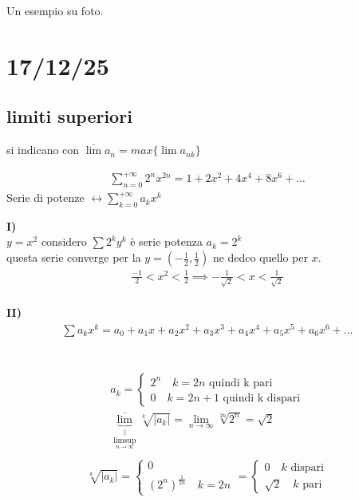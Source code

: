 \documentclass[a4paper, oneside]{article}
\begin{document}
Un esempio su foto.


\section{17/12/25}
\subsection{limiti superiori}
si indicano con $\overline{\lim} a_n = max\{ \lim a_{nk} \}$
\begin{example}
  \begin{gather*}
    \sum_{n=0}^{+\infty} 2^n x^{2n} = 1 +2x^2 + 4x^4 + 8x^6 + \dots
  \end{gather*}
  Serie di potenze $\leftrightarrow \sum_{k=0}^{+\infty} a_k x^k$
\end{example}

\textbf{I)} \\
$y = x^2$ considero $\sum 2^k y^k$ è serie potenza $a_k = 2^k$\\
 questa serie converge per la $y = (-\frac{1}{2}, \frac{1}{2})$ ne dedco quello per $x$.
 \begin{gather*}
    \frac{-1}{2} < x^2 < \frac{1}{2} \implies -\frac{1}{\sqrt{2}} < x < \frac{1}{\sqrt{2}}
 \end{gather*} 
\hfill\\
\textbf{II)}
\begin{gather*}
  \sum a_k x^k = a_0 + a_1 x + a_2 x^2 + a_3 x^3 + a_4 x^4 + a_5 x^5 + a_6 x^6 + \dots \\
\end{gather*}

\hfill\\
\begin{gather*}
  a_k = \begin{cases}
    2^{n} \quad k = 2n \text{ quindi k pari}\\
    0 \quad k = 2n + 1 \text{ quindi k dispari}
  \end{cases} \\
  \underbrace{\overline{\lim}}_{\overset{||}{\limsup_{n \to \infty}}} \sqrt[k]{|a_k|} = \lim_{n\to \infty} \sqrt[2n]{2^n} = \sqrt{2} \\
\end{gather*}
\begin{gather*}
  \sqrt[k]{|a_k|} = \begin{cases}
    0\\
    (2^n)^{\frac{1}{2n}} \quad k = 2n
  \end{cases} = \begin{cases}
    0 \quad k \text{ dispari}\\
    \sqrt{2} \quad k \text{ pari}
  \end{cases}
\end{gather*}
\end{document}
